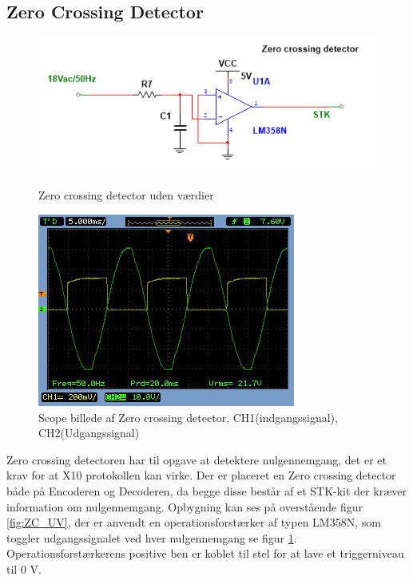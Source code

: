 \subsection{Zero Crossing Detector}
\begin{figure}[htb]
  \begin{minipage}{0.45\textwidth}
    \centering
      \includegraphics[width=\textwidth]{billeder/HWdesign/ZC_UV}
      \caption{Zero crossing detector uden værdier}
    \label{fig:ZC_UV}
  \end{minipage}
  \hspace{0.1\textwidth}
  \begin{minipage}{0.45\textwidth}
    \centering
      \includegraphics[width=\textwidth]{billeder/HWTest/Encoder/Encoder_zerocross}
      \caption{Scope billede af Zero crossing detector, CH1(indgangssignal), CH2(Udgangssignal)}
    \label{fig:Encoder_Zerocross}
  \end{minipage}
\end{figure}

Zero crossing detectoren har til opgave at detektere nulgennemgang, det er et krav for at X10 protokollen kan virke. Der er placeret en Zero crossing detector både på Encoderen og Decoderen, da begge disse består af et STK-kit der kræver information om nulgennemgang. Opbygning kan ses på overstående figur \ref{fig:ZC_UV}, der er anvendt en operationsforstærker af typen LM358N, som toggler udgangssignalet ved hver nulgennemgang se figur \ref{fig:Encoder_Zerocross}. Operationsforstærkerens positive ben er koblet til stel for at lave et triggerniveau til 0 V.

